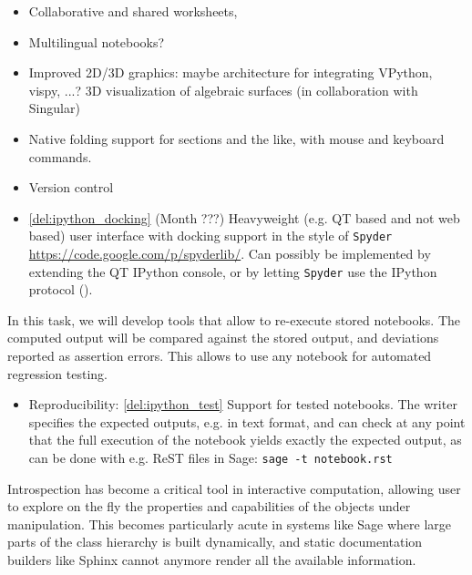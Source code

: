 \begin{workpackage}[id=UI,wphases=24-48,
  title=User Interfaces,
  PSRM=1,
  JURM=12, %
  LLRM=1, %
  SARM=1, %
  UKRM=1, %
  UBRM=1, %
  USORM=25]
\begin{tasklist}
\begin{task}[title=Notebook interface usability]

  \begin{itemize}
  \item Collaborative and shared worksheets,
  \item Multilingual notebooks?
  \item Improved 2D/3D graphics: maybe architecture for integrating
    VPython, vispy, ...? 3D visualization of algebraic surfaces (in
    collaboration with Singular)
  \item Native folding support for sections and the like, with mouse
    and keyboard commands.
  \item Version control
  \item \ref{del:ipython_docking} (Month ???) Heavyweight (e.g. QT
    based and not web based) user interface with docking support in
    the style of \texttt{Spyder}
    \url{https://code.google.com/p/spyderlib/}. Can possibly be
    implemented by extending the QT IPython console, or by letting
    \texttt{Spyder} use the IPython protocol ().
  \end{itemize}
\end{task}

\begin{task}[id=notebook-verification,title=Using Notebooks for verification tests]
  In this task, we will develop tools that allow to re-execute stored
  notebooks. The computed output will be compared against the stored
  output, and deviations reported as assertion errors. This allows to
  use any notebook for automated regression testing.

  \begin{itemize}
  \item Reproducibility: \ref{del:ipython_test} Support for tested
    notebooks. The writer specifies the expected outputs, e.g. in text
    format, and can check at any point that the full execution of the
    notebook yields exactly the expected output, as can be done with
    e.g. ReST files in Sage: \lstinline{sage -t notebook.rst}
  \end{itemize}
\end{task}

\begin{task}[title=Dynamic documentation and exploration system]

  Introspection has become a critical tool in interactive computation,
  allowing user to explore on the fly the properties and capabilities
  of the objects under manipulation. This becomes particularly acute
  in systems like Sage where large parts of the class hierarchy is
  built dynamically, and static documentation builders like Sphinx
  cannot anymore render all the available information.


\end{task}
\end{tasklist}
\end{workpackage}
